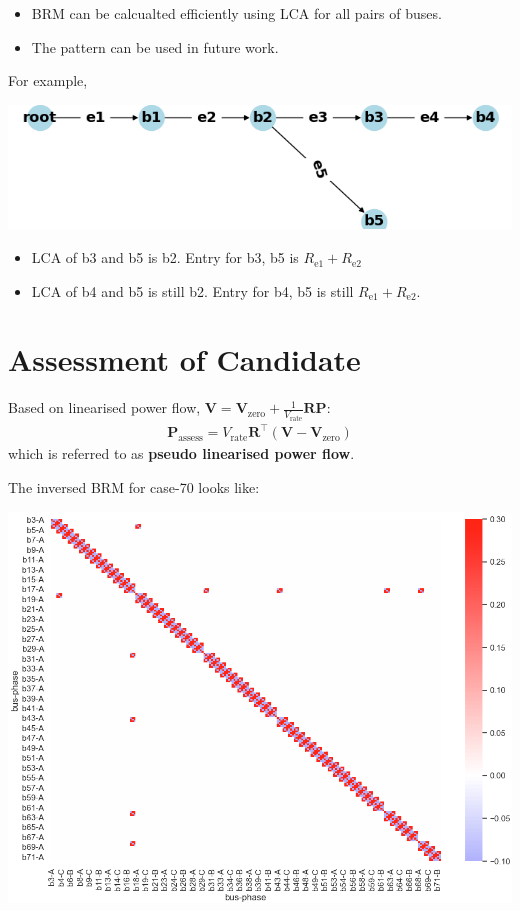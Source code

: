 \documentclass[
]{book}
\providecommand{\tightlist}{%
  \setlength{\itemsep}{0pt}\setlength{\parskip}{0pt}}
\begin{document}
\begin{itemize}
\tightlist
\item
  BRM can be calcualted efficiently using LCA for all pairs of buses.
\item
  The pattern can be used in future work.
\end{itemize}

For example,

\begin{center}\includegraphics[width=0.7\linewidth]{Pictures/figCaseSix} \end{center}

\begin{itemize}
\tightlist
\item
  LCA of b3 and b5 is b2. Entry for b3, b5 is \(R_\text{e1} + R_\text{e2}\)
\item
  LCA of b4 and b5 is still b2. Entry for b4, b5 is still \(R_\text{e1} + R_\text{e2}\).
\end{itemize}

\hypertarget{assessment}{%
\section{Assessment of Candidate}\label{assessment}}

Based on linearised power flow, \(\boldsymbol{V} = \boldsymbol{V}_\text{zero} + \frac{1}{V_\text{rate}} \boldsymbol{R} \boldsymbol{P}\):
\[ \begin{aligned}
    \boldsymbol{P}_\text{assess} =
    V_\text{rate} \boldsymbol{R}^{\top}
    \left( \boldsymbol{V} - \boldsymbol{V}_\text{zero} \right)
\end{aligned} \]
which is referred to as \textbf{pseudo linearised power flow}.

The inversed BRM for case-70 looks like:

\begin{center}\includegraphics{Pictures/figHeatmapBrmInv} \end{center}
\end{document}
